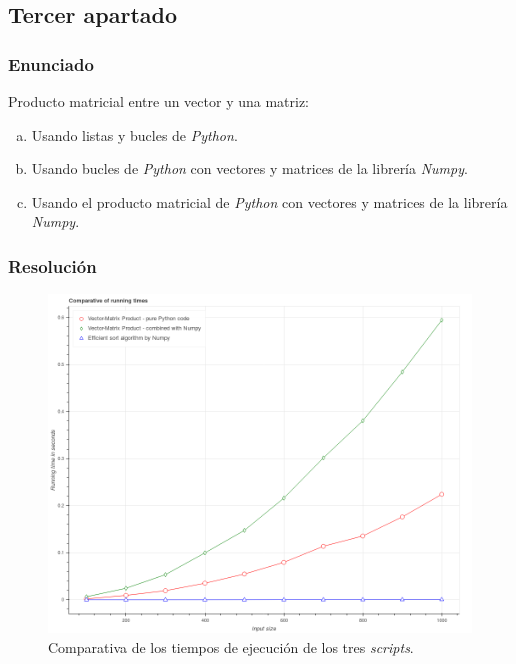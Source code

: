 \documentclass[12pt,twoside]{article}
\begin{document}
\subsection{Tercer apartado}

\subsubsection{Enunciado}

\noindent
Producto matricial entre un vector y una matriz:

\begin{enumerate}[(a)]

\item Usando listas y bucles de \textit{Python}.

\item Usando bucles de \textit{Python} con vectores y matrices de la librería \textit{Numpy}.

\item Usando el producto matricial de \textit{Python} con vectores y matrices de la librería \textit{Numpy}.

\end{enumerate}

\subsubsection{Resolución}

\begin{figure}[hbt]
\begin{center}
	\includegraphics[width=1\textwidth]{31.png}
	\caption{Comparativa de los tiempos de ejecución de los tres \textit{scripts}.}
	\label{fig:fig4}
\end{center}
\end{figure}
\end{document}
